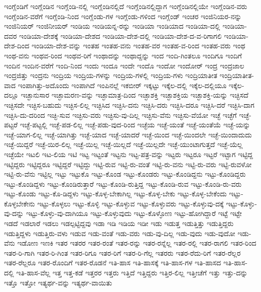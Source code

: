 {ಇಂಗ್ಲೆಂಡಿಗೆ
ಇಂಗ್ಲೆಂಡಿನ
ಇಂಗ್ಲೆಂಡಿ-ನಲ್ಲಿ
ಇಂಗ್ಲೆಂಡಿನಲ್ಲಿದೆ
ಇಂಗ್ಲೆಂಡಿನಲ್ಲಿದ್ದಾಗ
ಇಂಗ್ಲೆಂಡಿನಲ್ಲಿಯೇ
ಇಂಗ್ಲೆಂಡಿನ-ವರು
ಇಂಗ್ಲೆಂಡಿನ-ವರೆಗೆ
ಇಂಗ್ಲೆಂಡಿ-ನಿಂದ
ಇಂಗ್ಲೆಂಡು-ಗಳ
ಇಂಗ್ಲೆಂಡು-ಗಳಿಂದ
ಇಂಗ್ಲೆಂಡ್
ಇಂಚರ
ಇಂಜಿನಿಯರ-ನನ್ನು
ಇಂಜಿನಿಯರ್
ಇಂಜಿನೀಯರ್
ಇಂಡಿಯ
ಇಂಡಿಯನ್ನ-ರನ್ನು
ಇಂಡಿಯಾ
ಇಂಡಿಯಾದ
ಇಂಡಿಯಾ-ದಲ್ಲಿ
ಇಂಡಿಯಾ-ದವರ
ಇಂಡಿಯಾ-ದೇಶಕ್ಕೆ
ಇಂಡಿಯಾ-ದೇಶದ
ಇಂಡಿಯಾ-ದೇಶ-ದಲ್ಲಿ
ಇಂಡಿಯಾ-ದೇಶ-ದ-ವ-ರಿಗಾಗಲಿ
ಇಂಡಿಯಾ-ದೇಶ-ದಿಂದ
ಇಂಡಿಯಾ-ದೇಶ-ವನ್ನು
ಇಂತಹ
ಇಂತಹ-ವನು
ಇಂತಹ-ವರ
ಇಂತಹ-ವ-ರಿಂದ
ಇಂತಹ-ವರು
ಇಂಥ
ಇಂಥ-ವನು
ಇಂಥವ-ರಿಂದ
ಇಂಥವ-ರಿಗೆ
ಇಂಥಾದನ್ನು
ಇಂಥಾದ್ದನ್ನು
ಇಂದ
ಇಂದಿ-ಗಿಂತಲೂ
ಇಂದಿಗೂ
ಇಂದಿಗೆ
ಇಂದಿನ
ಇಂದಿನ-ವರೆಗೆ
ಇಂದಿ-ನಿಂದ
ಇಂದು
ಇಂದೂ
ಇಂದೇ
ಇಂದೊ
ಇಂದೋ
ಇಂದೋರ್
ಇಂದ್ರ
ಇಂದ್ರಜಾಲ
ಇಂದ್ರಜಿತ್ತು
ಇಂದ್ರನು
ಇಂದ್ರಿಯ
ಇಂದ್ರಿಯ-ಗಳನ್ನು
ಇಂದ್ರಿಯ-ಗಳಲ್ಲಿ
ಇಂದ್ರಿಯ-ಗಳು
ಇಂದ್ರಿಯಾತೀತ
ಇಂದ್ರಿಯಾತೀತ-ವಾದ
ಇಂಪಾಗಿತ್ತು-ಅದೊಂದು
ಇಂಪಾಗಿದೆ
ಇಂಪಿನಲ್ಲೆ
ಇಕಬೀರ್
ಇಕ್ಕಟ್ಟು
ಇಕ್ಕೆಲ-ದಲ್ಲಿ
ಇಕ್ಕೆಲ-ದಲ್ಲಿಯೂ
ಇಕ್ಕೆಲ-ದಲ್ಲೂ
ಇಚ್ಛಾನುಸಾರ
ಇಚ್ಛಾಮರಣ-ವನ್ನು
ಇಚ್ಛಾಮಾತ್ರ-ದಿಂದ
ಇಚ್ಛಾಶಕ್ತಿ
ಇಚ್ಛಾಶಕ್ತಿಯ
ಇಚ್ಛಾಶಕ್ತಿ-ಯನ್ನು
ಇಚ್ಛಿಸದೆ
ಇಚ್ಛಿಸದೇ
ಇಚ್ಛಿಸ-ಬಹುದು
ಇಚ್ಛಿಸ-ಲಿಲ್ಲ
ಇಚ್ಛಿಸಿದ
ಇಚ್ಛಿಸಿ-ದನು
ಇಚ್ಛಿಸಿ-ದರು
ಇಚ್ಛಿಸಿ-ದರೂ
ಇಚ್ಛಿಸಿ-ದರೆ
ಇಚ್ಛಿಸಿ-ದಾಗ
ಇಚ್ಛಿಸಿ-ದು-ದರಿಂದ
ಇಚ್ಛಿ-ಸುವ
ಇಚ್ಛಿಸು-ವರು
ಇಚ್ಛಿಸು-ವು-ದಿಲ್ಲ
ಇಚ್ಛಿಸು-ವೆನು
ಇಚ್ಛಿಸು-ವೆಯೋ
ಇಚ್ಛೆ
ಇಚ್ಛೆಗೆ
ಇಚ್ಛೆ-ಪಟ್ಟರೆ
ಇಚ್ಛೆ-ಪಟ್ಟಲ್ಲಿ
ಇಚ್ಛೆ-ಪಡ-ಲಿಲ್ಲ
ಇಚ್ಛೆ-ಪಡು-ವುದ-ರಿಂದ
ಇಚ್ಛೆಯ
ಇಚ್ಛೆ-ಯಂತೆ
ಇಚ್ಛೆ-ಯಂತೆಯೆ
ಇಚ್ಛೆ-ಯನ್ನು
ಇಚ್ಛೆ-ಯಾಗ-ಲಿಲ್ಲ
ಇಚ್ಛೆ-ಯಾಗಿತ್ತು
ಇಚ್ಛೆ-ಯಾದ
ಇಚ್ಛೆ-ಯಾದರೆ
ಇಚ್ಛೆ-ಯಿಂದ
ಇಚ್ಛೆ-ಯಿಂದಲೇ
ಇಚ್ಛೆ-ಯಿಂದಾದುದು
ಇಚ್ಛೆ-ಯಿದ್ದರೆ
ಇಚ್ಛೆ-ಯಿರ-ಲಿಲ್ಲ
ಇಚ್ಛೆ-ಯಿಲ್ಲ
ಇಚ್ಛೆ-ಯಿಲ್ಲದೆ
ಇಚ್ಛೆ-ಯಿಲ್ಲದೇ
ಇಚ್ಛೆ-ಯುಂಟಾಗುತ್ತದೆ
ಇಚ್ಛೆ-ಯೆಲ್ಲ
ಇಚ್ಛೆಯೇ
ಇಟಲಿ
ಇಟ-ಲಿಯ
ಇಟಿ
ಇಟ್ಟ
ಇಟ್ಟಂತೆ
ಇಟ್ಟನು
ಇಟ್ಟ-ಪತ್ರ-ವನ್ನು
ಇಟ್ಟರು
ಇಟ್ಟರೂ
ಇಟ್ಟರೆ
ಇಟ್ಟಾಗ
ಇಟ್ಟಿದ್ದ
ಇಟ್ಟಿದ್ದರು
ಇಟ್ಟಿದ್ದರೂ
ಇಟ್ಟಿದ್ದರೆ
ಇಟ್ಟಿದ್ದು
ಇಟ್ಟಿ-ರುವ
ಇಟ್ಟಿ-ರು-ವಂತೆ
ಇಟ್ಟಿ-ರು-ವನು
ಇಟ್ಟಿ-ರು-ವರು
ಇಟ್ಟಿ-ರುವಳೋ
ಇಟ್ಟಿ-ರು-ವೆನು
ಇಟ್ಟಿಲ್ಲ
ಇಟ್ಟು
ಇಟ್ಟುಕೊ
ಇಟ್ಟು-ಕೊಂಡ
ಇಟ್ಟು-ಕೊಂಡರು
ಇಟ್ಟು-ಕೊಂಡಿದ್ದನು
ಇಟ್ಟು-ಕೊಂಡಿದ್ದರು
ಇಟ್ಟು-ಕೊಂಡಿದ್ದಳು
ಇಟ್ಟು-ಕೊಂಡಿರುತ್ತಾರೆ
ಇಟ್ಟು-ಕೊಂಡಿ-ರುತ್ತಿದ್ದ
ಇಟ್ಟು-ಕೊಂಡಿ-ರುವ
ಇಟ್ಟು-ಕೊಂಡಿ-ರು-ವರು
ಇಟ್ಟು-ಕೊಂಡು
ಇಟ್ಟು-ಕೊ-ಡಿದ್ದಳು
ಇಟ್ಟು-ಕೊಳ್ಳ-ಬೇಕಾಗಿಲ್ಲ
ಇಟ್ಟು-ಕೊಳ್ಳ-ಬೇಕು
ಇಟ್ಟು-ಕೊಳ್ಳ-ಬೇಕೆಂದು
ಇಟ್ಟು-ಕೊಳ್ಳಬೇಕೇನು
ಇಟ್ಟು-ಕೊಳ್ಳಲು
ಇಟ್ಟು-ಕೊಳ್ಳಿ
ಇಟ್ಟು-ಕೊಳ್ಳುವ
ಇಟ್ಟು-ಕೊಳ್ಳುವರು
ಇಟ್ಟು-ಕೊಳ್ಳುವು-ದಕ್ಕೆ
ಇಟ್ಟು-ಕೊಳ್ಳು-ವು-ದನ್ನು
ಇಟ್ಟು-ಕೊಳ್ಳು-ವು-ದಾಗಿಯೂ
ಇಟ್ಟು-ಕೊಳ್ಳುವುದು
ಇಟ್ಟು-ಕೊಳ್ಳೋಣ
ಇಟ್ಟು-ಹೋಗಿದ್ದಾರೆ
ಇಟ್ಟೆ
ಇಟ್ಟೇ
ಇಡದೆ
ಇಡಲಾರೆ
ಇಡಲು
ಇಡಲ್ಪಟ್ಟಿದ್ದವು
ಇಡಾ
ಇಡಿ
ಇಡಿಯ
ಇಡೀ
ಇಡು
ಇಡುತ್ತ
ಇಡುತ್ತಿತ್ತು
ಇಡುತ್ತಿದ್ದರು
ಇಡುತ್ತಿದ್ದಳು
ಇಡುತ್ತಿರು-ವಳು
ಇಡುವ
ಇಡು-ವಂತೆ
ಇಡು-ವರು
ಇಡು-ವು-ದಿಲ್ಲ
ಇಡು-ವುದು
ಇಡು-ವುದೋ
ಇಡು-ವೆನು
ಇಡೋಣ
ಇಣಕಿ
ಇತರ
ಇತರರ
ಇತರ-ರಂತೆ
ಇತರ-ರನ್ನು
ಇತರ-ರನ್ನೆಲ್ಲ
ಇತರ-ರಲ್ಲಿ
ಇತರ-ರಾಗಲಿ
ಇತರ-ರಿಂದ
ಇತರ-ರಿ-ಗಾಗಿ
ಇತರ-ರಿ-ಗಿಂತ
ಇತರ-ರಿಗೂ
ಇತರ-ರಿಗೆ
ಇತರ-ರಿ-ಗೆಲ್ಲ
ಇತರರು
ಇತರ-ರೆದು-ರಿಗೆ
ಇತರ-ರೆಲ್ಲರ
ಇತರ-ರೆಲ್ಲರೂ
ಇತರ-ರೊಂದಿಗೆ
ಇತರ-ರೊಡನೆ
ಇತಿ-ಹಾಸ
ಇತಿ-ಹಾಸಕ್ಕೆ
ಇತಿ-ಹಾಸ-ಗಳ
ಇತಿ-ಹಾಸದ
ಇತಿ-ಹಾಸ-ದಲ್ಲಿ
ಇತಿ-ಹಾಸ-ವೆಲ್ಲ
ಇತ್ತ
ಇತ್ತ-ಕಡೆ
ಇತ್ತರರ
ಇತ್ತರು
ಇತ್ತಿದೆ
ಇತ್ತಿದ್ದರು
ಇತ್ತಿರ-ಲಿಲ್ಲ
ಇತ್ತೀಚೆಗೆ
ಇತ್ತು
ಇತ್ತು-ದನ್ನು
ಇತ್ತೊ
ಇತ್ತೋ
ಇತ್ಯರ್ಥ-ವನ್ನು
ಇತ್ಯರ್ಥ-ವಾಯಿತು
}
